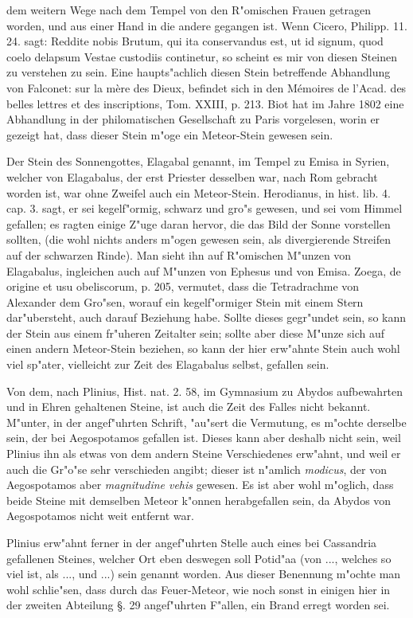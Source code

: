 \documentclass[a4paper, 11pt, oneside, polutonikogreek, german]{article}
\begin{document}
dem weitern Wege nach dem Tempel von den R"omischen Frauen getragen worden, und aus einer Hand in die andere gegangen ist. Wenn Cicero, Philipp. 11. 24. sagt: Reddite nobis Brutum, qui ita conservandus est, ut id signum, quod coelo delapsum Vestae custodiis continetur, so scheint es mir von diesen Steinen zu verstehen zu sein. Eine haupts"achlich diesen Stein betreffende Abhandlung von Falconet: sur la mère des Dieux, befindet sich in den Mémoires de l'Acad. des belles lettres et des inscriptions, Tom. XXIII, p. 213. Biot hat im Jahre 1802 eine Abhandlung in der philomatischen Gesellschaft zu Paris vorgelesen, worin er gezeigt hat, dass dieser Stein m"oge ein Meteor-Stein gewesen sein.

Der Stein des Sonnengottes, Elagabal genannt, im Tempel zu Emisa in Syrien, welcher von Elagabalus, der erst Priester desselben war, nach Rom gebracht worden ist, war ohne Zweifel auch ein Meteor-Stein. Herodianus, in hist. lib. 4. cap. 3. sagt, er sei kegelf"ormig, schwarz und gro"s gewesen, und sei vom Himmel gefallen; es ragten einige Z"uge daran hervor, die das Bild der Sonne vorstellen sollten, (die wohl nichts anders m"ogen gewesen sein, als divergierende Streifen auf der schwarzen Rinde). Man sieht ihn auf R"omischen M"unzen von Elagabalus, ingleichen auch auf M"unzen von Ephesus und von Emisa. Zoega, de origine et usu obeliscorum, p. 205, vermutet, dass die Tetradrachme von Alexander dem Gro"sen, worauf ein kegelf"ormiger Stein mit einem Stern dar"ubersteht, auch darauf Beziehung habe. Sollte dieses gegr"undet sein, so kann der Stein aus einem fr"uheren Zeitalter sein; sollte aber diese M"unze sich auf einen andern Meteor-Stein beziehen, so kann der hier erw"ahnte Stein auch wohl viel sp"ater, vielleicht zur Zeit des Elagabalus selbst, gefallen sein.

Von dem, nach Plinius, Hist. nat. 2. 58, im Gymnasium zu Abydos aufbewahrten und in Ehren gehaltenen Steine, ist auch die Zeit des Falles nicht bekannt. M"unter, in der angef"uhrten Schrift, "au"sert die Vermutung, es m"ochte derselbe sein, der bei Aegospotamos gefallen ist. Dieses kann aber deshalb nicht sein, weil Plinius ihn als etwas von dem andern Steine Verschiedenes erw"ahnt, und weil er auch die Gr"o"se sehr verschieden angibt; dieser ist n"amlich \emph{modicus}, der von Aegospotamos aber \emph{magnitudine vehis} gewesen. Es ist aber wohl m"oglich, dass beide Steine mit demselben Meteor k"onnen herabgefallen sein, da Abydos von Aegospotamos nicht weit entfernt war.

Plinius erw"ahnt ferner in der angef"uhrten Stelle auch eines bei Cassandria gefallenen Steines, welcher Ort eben deswegen soll Potid"aa (von ..., welches so viel ist, als ..., und ...) sein genannt worden. Aus dieser Benennung m"ochte man wohl schlie"sen, dass durch das Feuer-Meteor, wie noch sonst in einigen hier in der zweiten Abteilung §. 29 angef"uhrten F"allen, ein Brand erregt worden sei.
\end{document}
